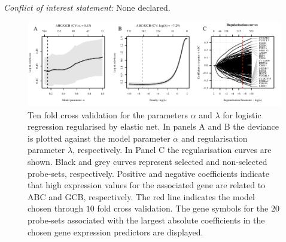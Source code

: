 \documentclass{article}
\begin{document}
\noindent\textit{Conflict of interest statement}: None declared.
{}




\begin{figure}[htb]
\begin{center}
\includegraphics[width=1\textwidth]{figures/CrosvalidationClass.pdf}
\end{center}
\caption{Ten fold cross validation for the parameters $\alpha$ and $\lambda$ for logistic regression regularised by elastic net.
In panels A and B the deviance is plotted against the model parameter $\alpha$ and regularisation parameter $\lambda$, respectively.
In Panel C the regularisation curves are shown.
Black and grey curves represent selected and non-selected probe-sets, respectively.
Positive and negative coefficients indicate that high expression values for the associated gene are related to ABC and GCB, respectively.
The red line indicates the model chosen through $10$ fold cross validation.
The gene symbols for the $20$ probe-sets associated with the largest absolute coefficients in the chosen gene expression predictors are displayed.}
\label{fig:crossval}
\end{figure}








\listoftodos
\end{document}
